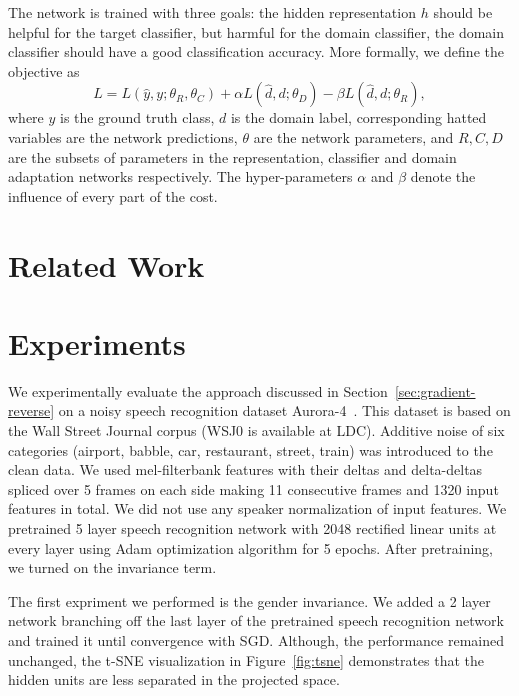 \documentclass{article}
\begin{document}
    The network is trained with three goals: the hidden representation $h$ should
    be helpful for the target classifier, but harmful for the domain classifier,
    the domain classifier should have a good classification accuracy. More 
    formally, we define the objective as
    \begin{equation}
        L = L(\hat{y}, y; \theta_R, \theta_C) + 
        \alpha L(\hat{d}, d; \theta_D) -
        \beta L(\hat{d}, d; \theta_R),
    \end{equation}
    where $y$ is the ground truth class, $d$ is the domain label, corresponding
    hatted variables are the network predictions, $\theta$ are the network 
    parameters, and $R, C, D$ are the subsets of parameters in the representation,
    classifier and domain adaptation networks respectively. The hyper-parameters
    $\alpha$ and $\beta$ denote the influence of every part of the cost.

\section{Related Work}

\section{Experiments}
We experimentally evaluate the approach discussed in Section~\ref{sec:gradient-reverse} 
on a noisy speech recognition dataset Aurora-4~\cite{parihar2002aurora}. This dataset
is based on the Wall Street Journal corpus (WSJ0 is available at LDC). Additive noise of 
six categories (airport, babble, car, restaurant, street, train) was introduced to the 
clean data. We used mel-filterbank features with their deltas and delta-deltas spliced
over 5 frames on each side making 11 consecutive frames and 1320 input features in total. 
We did not use any speaker normalization of input features. We pretrained 5 layer
speech recognition network with 2048 rectified linear units at every layer using Adam 
optimization algorithm for 5 epochs. After pretraining, we turned on the invariance term.

The first expriment we performed is the gender invariance. We added a 2 layer network 
branching off the last layer of the pretrained speech recognition network and 
trained it until convergence with SGD. Although, the performance remained unchanged,
the t-SNE visualization in Figure~\ref{fig:tsne} demonstrates that the hidden units
are less separated in the projected space.
\end{document}
